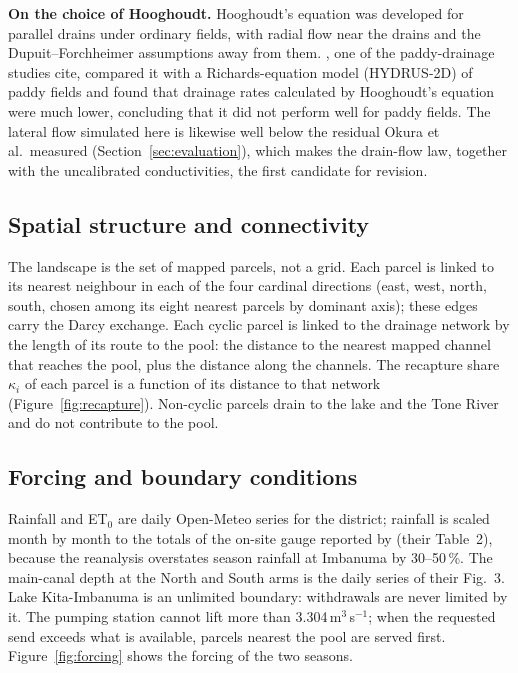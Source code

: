 \documentclass[11pt]{article}
\begin{document}
\textbf{On the choice of Hooghoudt.} Hooghoudt's equation was developed for parallel drains under ordinary fields, with radial flow near the drains and the Dupuit--Forchheimer assumptions away from them. \citet{Ebrahimian2015Hydrus}, one of the paddy-drainage studies \citet{Okura2025WaterBalance} cite, compared it with a Richards-equation model (HYDRUS-2D) of paddy fields and found that drainage rates calculated by Hooghoudt's equation were much lower, concluding that it did not perform well for paddy fields. The lateral flow simulated here is likewise well below the residual Okura et al.\ measured (Section~\ref{sec:evaluation}), which makes the drain-flow law, together with the uncalibrated conductivities, the first candidate for revision.

\subsection{Spatial structure and connectivity}
The landscape is the set of mapped parcels, not a grid. Each parcel is linked to its nearest neighbour in each of the four cardinal directions (east, west, north, south, chosen among its eight nearest parcels by dominant axis); these edges carry the Darcy exchange. Each cyclic parcel is linked to the drainage network by the length of its route to the pool: the distance to the nearest mapped channel that reaches the pool, plus the distance along the channels. The recapture share $\kappa_i$ of each parcel is a function of its distance to that network (Figure~\ref{fig:recapture}). Non-cyclic parcels drain to the lake and the Tone River and do not contribute to the pool.

\subsection{Forcing and boundary conditions}
Rainfall and ET$_0$ are daily Open-Meteo series for the district; rainfall is scaled month by month to the totals of the on-site gauge reported by \citet{Okura2025WaterBalance} (their Table~2), because the reanalysis overstates season rainfall at Imbanuma by 30--50\,\%. The main-canal depth at the North and South arms is the daily series of their Fig.~3. Lake Kita-Imbanuma is an unlimited boundary: withdrawals are never limited by it. The pumping station cannot lift more than 3.304\,m$^3$\,s$^{-1}$; when the requested send exceeds what is available, parcels nearest the pool are served first. Figure~\ref{fig:forcing} shows the forcing of the two seasons.
\end{document}
